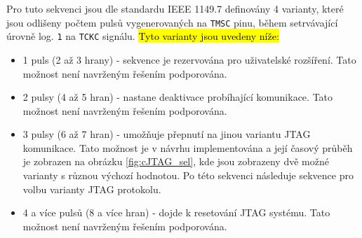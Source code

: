 Pro tuto sekvenci jsou dle standardu IEEE 1149.7 definovány 4 varianty, které jsou odlišeny počtem pulsů vygenerovaných na \texttt{\acs{TMSC}} pinu, během setrvávající úrovně log. \texttt{1} na \texttt{\acs{TCKC}} signálu. \hl{Tyto varianty jsou uvedeny níže:}

\begin{itemize}
	\item 1 puls (2 až 3 hrany) - sekvence je rezervována pro uživatelské rozšíření. Tato možnost není navrženým řešením podporována.
	\item 2 pulsy (4 až 5 hran) - nastane deaktivace probíhající komunikace. Tato možnost není navrženým řešením podporována.
	\item 3 pulsy (6 až 7 hran) - umožňuje přepnutí na jinou variantu \acs{JTAG} komunikace. Tato možnost je v návrhu implementována a její časový průběh je zobrazen na obrázku \ref{fig:cJTAG_sel}, kde jsou zobrazeny dvě možné varianty s různou výchozí hodnotou. Po této sekvenci následuje sekvence pro volbu varianty \acs{JTAG} protokolu.
	\item 4 a více pulsů (8 a více hran) - dojde k resetování \acs{JTAG} systému. Tato možnost není navrženým řešením podporována.
\end{itemize}



